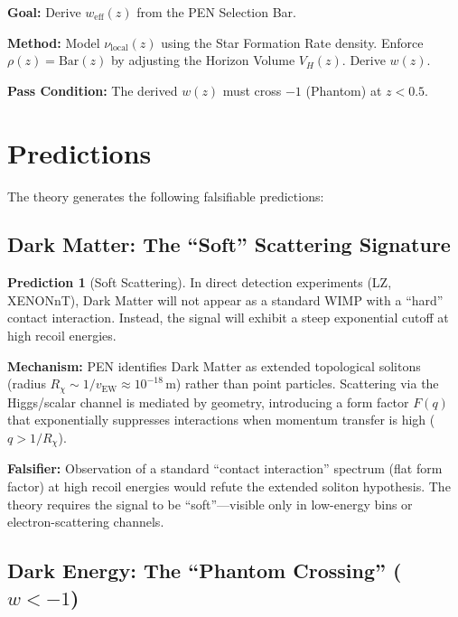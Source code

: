 \documentclass[11pt,a4paper]{article}
\theoremstyle{definition}
\newtheorem{prediction}{Prediction}
\theoremstyle{plain}
\theoremstyle{remark}
\newcommand{\eff}{\rho}
\newcommand{\novelty}{\nu}
\newcommand{\SelectionBar}{\mathrm{Bar}}
\begin{document}
\textbf{Goal:} Derive $w_{\mathrm{eff}}(z)$ from the PEN Selection Bar.

\textbf{Method:} Model $\novelty_{\mathrm{local}}(z)$ using the Star Formation Rate density. Enforce $\eff(z) = \SelectionBar(z)$ by adjusting the Horizon Volume $V_H(z)$. Derive $w(z)$.

\textbf{Pass Condition:} The derived $w(z)$ must cross $-1$ (Phantom) at $z < 0.5$.

\section{Predictions}

The theory generates the following falsifiable predictions:

\subsection{Dark Matter: The ``Soft'' Scattering Signature}

\begin{prediction}[Soft Scattering]
In direct detection experiments (LZ, XENONnT), Dark Matter will not appear as a standard WIMP with a ``hard'' contact interaction. Instead, the signal will exhibit a steep exponential cutoff at high recoil energies.
\end{prediction}

\textbf{Mechanism:} PEN identifies Dark Matter as extended topological solitons (radius $R_\chi \sim 1/v_\mathrm{EW} \approx 10^{-18}$\,m) rather than point particles. Scattering via the Higgs/scalar channel is mediated by geometry, introducing a form factor $F(q)$ that exponentially suppresses interactions when momentum transfer is high ($q > 1/R_\chi$).

\textbf{Falsifier:} Observation of a standard ``contact interaction'' spectrum (flat form factor) at high recoil energies would refute the extended soliton hypothesis. The theory requires the signal to be ``soft''---visible only in low-energy bins or electron-scattering channels.

\subsection{Dark Energy: The ``Phantom Crossing'' (\texorpdfstring{$w < -1$}{w < -1})}
\end{document}
